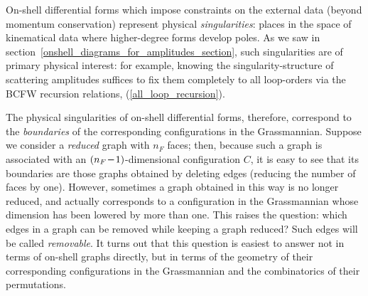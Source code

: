 \documentclass[12pt,hyperref,compress]{JHEP3}
\newcommand{\mi}{{\rm\rule[2.4pt]{6pt}{0.65pt}}}
\begin{document}
{On-shell differential forms which impose constraints on the external data (beyond momentum conservation) represent physical {\it singularities}: places in the space of kinematical data where higher-degree forms develop poles. As we saw in \mbox{section \ref{onshell_diagrams_for_amplitudes_section}}, such singularities are of primary physical interest: for example, knowing the singularity-structure of scattering amplitudes suffices to fix them completely to all loop-orders via the BCFW recursion relations, (\ref{all_loop_recursion}).

The physical singularities of on-shell differential forms, therefore, correspond to the {\it boundaries} of the corresponding configurations in the Grassmannian. Suppose we consider a {\it reduced} graph with $n_F$ faces; then, because such a graph is associated with an $(n_F\,\mi\,1)$-dimensional configuration $C$, it is easy to see that its boundaries are those graphs obtained by deleting edges (reducing the number of faces by one). However, sometimes a graph obtained in this way is no longer reduced, and actually corresponds to a configuration in the Grassmannian whose dimension has been lowered by more than one. This raises the question: which edges in a graph can be removed while keeping a graph reduced? Such edges will be called {\it removable}. It turns out that this question is easiest to answer not in terms of on-shell graphs directly, but in terms of the geometry of their corresponding configurations in the Grassmannian and the combinatorics of their permutations.




}
\end{document}

